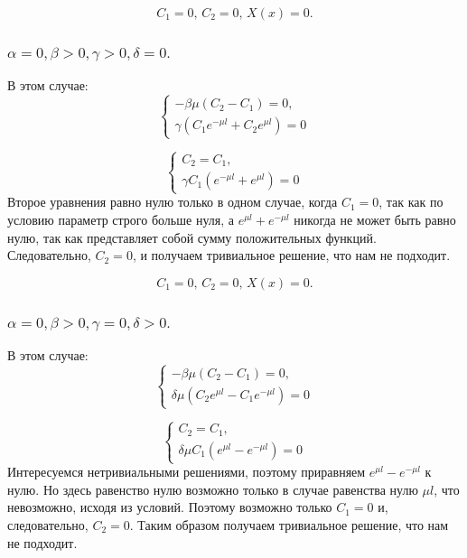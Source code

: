 \documentclass[12pt, a4paper]{report}
\begin{document}
\[ C_{1} = 0, \, C_{2} = 0, \, X(x) = 0. \]

\subsubsection{ $ \alpha = 0, \beta > 0, \gamma > 0, \delta = 0. $}
В этом случае:
\begin{displaymath}
	\begin{cases}
		- \beta \mu (C_{2} - C_{1}) = 0, \\
		\gamma (C_{1} e^{-\mu l} + C_{2} e^{\mu l}) = 0
	\end{cases}
\end{displaymath}

\begin{displaymath}
	\begin{cases}
		C_{2} = C_{1}, \\
		\gamma C_{1} (e^{-\mu l} + e^{\mu l}) = 0
	\end{cases}
\end{displaymath}
Второе уравнения равно нулю только в одном случае, когда $C_{1} = 0$, так как по условию параметр строго больше нуля, а $e^{\mu l} + e^{-\mu l}$ никогда не может быть равно нулю, так как представляет собой сумму положительных функций. Следовательно, $C_{2} = 0$, и получаем тривиальное решение, что нам не подходит.

\[ C_{1} = 0, \, C_{2} = 0, \, X(x) = 0. \]

\subsubsection{ $ \alpha = 0, \beta > 0, \gamma = 0, \delta > 0. $}
В этом случае:
\begin{displaymath}
	\begin{cases}
		- \beta \mu (C_{2} - C_{1}) = 0, \\
		\delta \mu (C_{2} e^{\mu l} - C_{1} e^{-\mu l}) = 0
	\end{cases}
\end{displaymath}

\begin{displaymath}
	\begin{cases}
		C_{2} = C_{1}, \\
		\delta \mu C_{1} (e^{\mu l} - e^{-\mu l}) = 0
	\end{cases}
\end{displaymath}
Интересуемся нетривиальными решениями, поэтому приравняем $e^{\mu l} - e^{-\mu l}$ к нулю. Но здесь равенство нулю возможно только в случае равенства нулю $\mu l$, что невозможно, исходя из условий. Поэтому возможно только $C_{1} = 0$ и, следовательно, $C_{2} = 0$. Таким образом получаем тривиальное решение, что нам не подходит.
\end{document}
